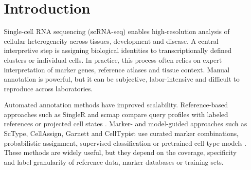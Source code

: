 \documentclass[unnumsec,webpdf,contemporary,large,numbered]{oup-authoring-template}
\begin{document}


\maketitle

\section{Introduction}

Single-cell RNA sequencing (scRNA-seq) enables high-resolution analysis of cellular heterogeneity across tissues, development and disease. A central interpretive step is assigning biological identities to transcriptionally defined clusters or individual cells. In practice, this process often relies on expert interpretation of marker genes, reference atlases and tissue context. Manual annotation is powerful, but it can be subjective, labor-intensive and difficult to reproduce across laboratories.

Automated annotation methods have improved scalability. Reference-based approaches such as SingleR and scmap compare query profiles with labeled references or projected cell states \cite{aran2019singler,singlerbook,kiselev2018scmap}. Marker- and model-guided approaches such as ScType, CellAssign, Garnett and CellTypist use curated marker combinations, probabilistic assignment, supervised classification or pretrained cell type models \cite{ianevski2022sctype,zhang2019cellassign,pliner2019garnett,dominguezconde2022celltypist}. These methods are widely useful, but they depend on the coverage, specificity and label granularity of reference data, marker databases or training sets.
\end{document}
